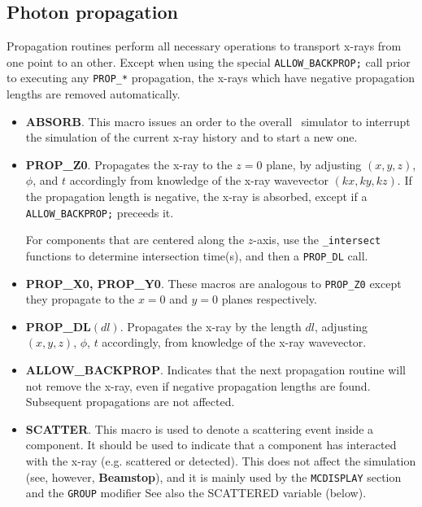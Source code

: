 \subsection{Photon propagation}
Propagation routines perform all necessary operations to transport x-rays
from one point to an other. Except when using the special
\verb+ALLOW_BACKPROP;+ call prior to executing any \verb+PROP_*+ propagation,
the x-rays which have negative propagation lengths are removed automatically.
\begin{itemize}
\item {\bfseries ABSORB}. This macro issues an order to the overall
  \MCX\ simulator to interrupt the simulation of the current x-ray
  history and to start a new one.
\item {\bfseries PROP\_Z0}. Propagates the x-ray to the $z=0$ plane,
  by adjusting $(x,y,z)$, $\phi$, and $t$ accordingly from knowledge of the
  x-ray wavevector $(kx,ky,kz)$.
  If the propagation length is negative, the x-ray is absorbed, except if a \verb+ALLOW_BACKPROP;+ preceeds it.

  For components that are centered along the $z$-axis,
  use the \verb+_intersect+ functions to determine intersection time(s),
  and then a \verb+PROP_DL+ call.
\item {\bfseries PROP\_X0, PROP\_Y0}. These macros are analogous to \verb+PROP_Z0+ except they propagate to the $x=0$ and $y=0$ planes respectively.

\item {\bfseries PROP\_DL}$(dl)$. Propagates the x-ray by the length $dl$, adjusting $(x,y,z)$, $\phi$, $t$ accordingly,
  from knowledge of the x-ray wavevector.
\item {\bfseries ALLOW\_BACKPROP}. Indicates that the next propagation routine
  will not remove the x-ray, even if negative propagation lengths
  are found. Subsequent propagations are not affected.
\item {\bfseries SCATTER}. This macro is used to denote a scattering event
  inside a component.
  It should be used
  to indicate that a component has interacted with the x-ray
  (e.g. scattered or detected).
  This does not affect the simulation (see, however, {\bfseries Beamstop}),
  and it is mainly used by the
  \verb+MCDISPLAY+ section and the \verb+GROUP+ modifier
  See also the SCATTERED variable (below).
    
\end{itemize}


